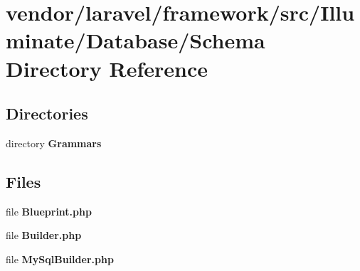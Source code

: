 \section{vendor/laravel/framework/src/\+Illuminate/\+Database/\+Schema Directory Reference}
\label{dir_5bc32520ff3304ddefc08eff406d11bc}
\subsection*{Directories}
\begin{DoxyCompactItemize}
\item 
directory {\bf Grammars}
\end{DoxyCompactItemize}
\subsection*{Files}
\begin{DoxyCompactItemize}
\item 
file {\bf Blueprint.\+php}
\item 
file {\bf Builder.\+php}
\item 
file {\bf My\+Sql\+Builder.\+php}
\end{DoxyCompactItemize}
